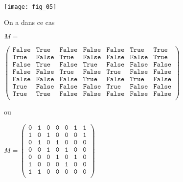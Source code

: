 \begin{exemple} ~\\
\begin{minipage}[b]{.47\linewidth}
\begin{center}
\texttt{[image: fig\_05]}
\end{center}

On a dans ce cas 

\footnotesize{$
M = $

$
\begin{pmatrix}
\texttt{False} & \texttt{True} & \texttt{False} & \texttt{False} & \texttt{False} & \texttt{True} & \texttt{True} \\
\texttt{True} & \texttt{False} & \texttt{True} & \texttt{False} & \texttt{False} & \texttt{False} & \texttt{True} \\ 
\texttt{False} & \texttt{True} & \texttt{False} & \texttt{True} & \texttt{False} & \texttt{False} & \texttt{False} \\
\texttt{False} & \texttt{False} & \texttt{True} & \texttt{False} & \texttt{True} & \texttt{False} & \texttt{False} \\
\texttt{False} & \texttt{False} & \texttt{False} & \texttt{True} & \texttt{False} & \texttt{True} & \texttt{False} \\
\texttt{True} & \texttt{False} & \texttt{False} & \texttt{False} & \texttt{True} & \texttt{False} & \texttt{False} \\
\texttt{True} & \texttt{True} & \texttt{False} & \texttt{False} & \texttt{False} & \texttt{False} & \texttt{False} \\
\end{pmatrix}$}

ou 

\footnotesize{$
M = 
\begin{pmatrix}
\texttt{0} & \texttt{1} & \texttt{0} & \texttt{0} & \texttt{0} & \texttt{1} & \texttt{1} \\
\texttt{1} & \texttt{0} & \texttt{1} & \texttt{0} & \texttt{0} & \texttt{0} & \texttt{1} \\ 
\texttt{0} & \texttt{1} & \texttt{0} & \texttt{1} & \texttt{0} & \texttt{0} & \texttt{0} \\
\texttt{0} & \texttt{0} & \texttt{1} & \texttt{0} & \texttt{1} & \texttt{0} & \texttt{0} \\
\texttt{0} & \texttt{0} & \texttt{0} & \texttt{1} & \texttt{0} & \texttt{1} & \texttt{0} \\
\texttt{1} & \texttt{0} & \texttt{0} & \texttt{0} & \texttt{1} & \texttt{0} & \texttt{0} \\
\texttt{1} & \texttt{1} & \texttt{0} & \texttt{0} & \texttt{0} & \texttt{0} & \texttt{0} \\
\end{pmatrix}$}



\end{minipage}
\end{exemple}
